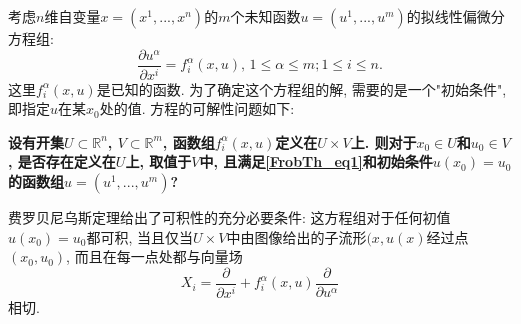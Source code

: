 考虑$n$维自变量$x=(x^1,...,x^n)$的$m$个未知函数$u=(u^1,...,u^m)$的拟线性偏微分方程组:
\begin{equation}\label{FrobTh_eq1}
\frac{\partial u^\alpha}{\partial x^i}=f_i^\alpha(x,u),\,1\leq\alpha\leq m;1\leq i\leq n.
\end{equation}
这里$f_i^\alpha(x,u)$是已知的函数. 为了确定这个方程组的解, 需要的是一个"初始条件", 即指定$u$在某$x_0$处的值. 方程的可解性问题如下:

\textbf{设有开集$U\subset\mathbb{R}^n$, $V\subset\mathbb{R}^m$, 函数组$f_i^\alpha(x,u)$定义在$U\times V$上. 则对于$x_0\in U$和$u_0\in V$, 是否存在定义在$U$上, 取值于$V$中, 且满足\autoref{FrobTh_eq1}和初始条件$u(x_0)=u_0$的函数组$u=(u^1,...,u^m)$?}

费罗贝尼乌斯定理给出了可积性的充分必要条件: 这方程组对于任何初值$u(x_0)=u_0$都可积, 当且仅当$U\times V$中由图像给出的子流形$(x,u(x)$经过点$(x_0,u_0)$, 而且在每一点处都与向量场
$$
X_i=\frac{\partial}{\partial x^i}+f_i^\alpha(x,u)\frac{\partial}{\partial u^\alpha}
$$
相切.